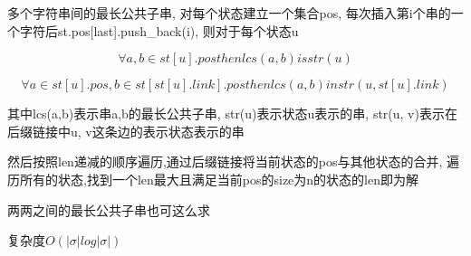 多个字符串间的最长公共子串, 对每个状态建立一个集合pos, 每次插入第i个串的一个字符后st.pos[last].push_back(i), 则对于每个状态u

$$\forall a,b \in st[u].pos then lcs(a, b) is str(u)$$

$$\forall a\in st[u].pos, b\in st[st[u].link].pos then lcs(a, b) in str(u, st[u].link)$$

其中lcs(a,b)表示串a,b的最长公共子串, str(u)表示状态u表示的串, str(u, v)表示在后缀链接中u, v这条边的表示状态表示的串

然后按照len递减的顺序遍历,通过后缀链接将当前状态的pos与其他状态的合并, 遍历所有的状态,找到一个len最大且满足当前pos的size为n的状态的len即为解

两两之间的最长公共子串也可这么求

复杂度$O(|\sigma| log|\sigma|)$